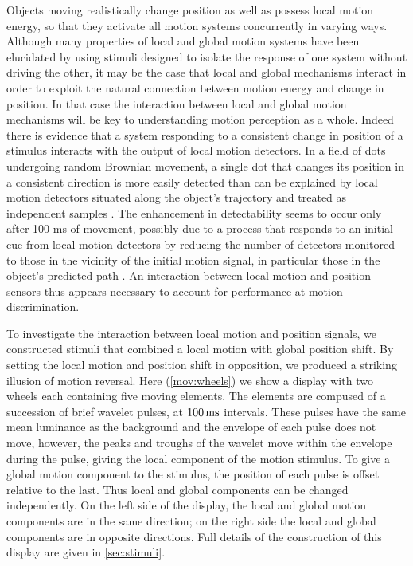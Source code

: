 \documentclass[manuscript]{subfiles}
\begin{document}
Objects moving realistically change position as well as possess local motion energy, so that they activate all motion systems concurrently in varying ways. Although many properties of local and global motion systems have been elucidated by using stimuli designed to isolate the response of one system without driving the other, it may be the case that local and global mechanisms interact in order to exploit the natural connection between motion energy and change in position. In that case the interaction between local and global motion mechanisms will be key to understanding motion perception as a whole. Indeed there is evidence that a system responding to a consistent change in position of a stimulus interacts with the output of local motion detectors. In a field of dots undergoing random Brownian movement, a single dot that changes its position in a consistent direction is more easily detected than can be explained by local motion detectors situated along the object's trajectory and treated as independent samples \citep{Verghese:1999lq}. The enhancement in detectability seems to occur only after 100 ms of movement, possibly due to a process that responds to an initial cue from local motion detectors by reducing the number of detectors monitored to those in the vicinity of the initial motion signal, in particular those in the object's predicted path \citep{VerghesePreeti2002}. An interaction between local motion and position sensors thus appears necessary to account for performance at motion discrimination. 

To investigate the interaction between local motion and position signals, we constructed stimuli that combined a local motion with global position shift. By setting the local motion and position shift in opposition, we produced a striking illusion of motion reversal. Here (\autoref{mov:wheels}) we show a display with two wheels each containing five moving elements. The elements are compused of a succession of brief wavelet pulses, at $\unit[100]{ms}$ intervals. These pulses have the same mean luminance as the background and the envelope of each pulse does not move, however, the peaks and troughs of the wavelet move within the envelope during the pulse, giving the local component of the motion stimulus. To give a global motion component to the stimulus, the position of each pulse is offset relative to the last. Thus local and global components can be changed independently. On the left side of the display, the local and global motion components are in the same direction; on the right side the local and global components are in opposite directions. Full details of the construction of this display are given in \autoref{sec:stimuli}.
\end{document}
